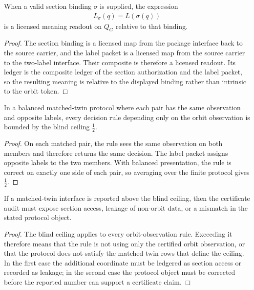 \begin{theorem}
\label{thm:philosophy-meaning-section-relative}
When a valid section binding $\sigma$ is supplied, the expression
$$
\begin{gathered}
L_\sigma(q)=L(\sigma(q))
\end{gathered}
$$
is a licensed meaning readout on $Q_G$ relative to that binding.
\end{theorem}
\begin{proof}
The section binding is a licensed map from the package interface back
to the source carrier, and the label packet is a licensed map from the
source carrier to the two-label interface. Their composite is therefore
a licensed readout. Its ledger is the composite ledger of the section
authorization and the label packet, so the resulting meaning is
relative to the displayed binding rather than intrinsic to the orbit
token.
\end{proof}

\begin{corollary}
\label{cor:philosophy-matched-twins-force-blind-ceiling}
In a balanced matched-twin protocol where each pair has the same
observation and opposite labels, every decision rule depending only on
the orbit observation is bounded by the blind ceiling $\frac12$.
\end{corollary}
\begin{proof}
On each matched pair, the rule sees the same observation on both
members and therefore returns the same decision. The label packet
assigns opposite labels to the two members. With balanced presentation,
the rule is correct on exactly one side of each pair, so averaging over
the finite protocol gives $\frac12$.
\end{proof}

\begin{corollary}
\label{cor:philosophy-section-access-leakage-protocol-mismatch}
If a matched-twin interface is reported above the blind ceiling, then
the certificate audit must expose section access, leakage of non-orbit
data, or a mismatch in the stated protocol object.
\end{corollary}
\begin{proof}
The blind ceiling applies to every orbit-observation rule. Exceeding it
therefore means that the rule is not using only the certified orbit
observation, or that the protocol does not satisfy the matched-twin
rows that define the ceiling. In the first case the additional
coordinate must be ledgered as section access or recorded as leakage;
in the second case the protocol object must be corrected before the
reported number can support a certificate claim.
\end{proof}
